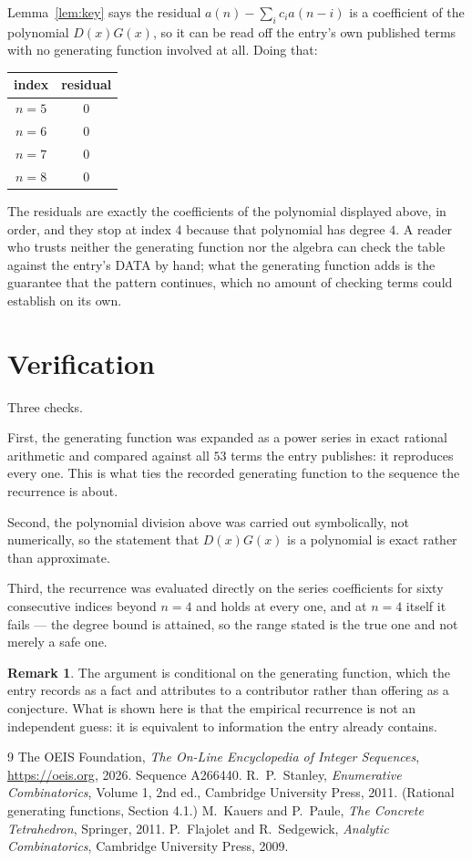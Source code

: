 \documentclass[11pt,a4paper]{article}
\theoremstyle{plain}
\theoremstyle{definition}
\newtheorem{remark}[theorem]{Remark}
\begin{document}
Lemma~\ref{lem:key} says the residual $a(n)-\sum_ic_ia(n-i)$ is a coefficient of the
polynomial $D(x)G(x)$, so it can be read off the entry's own published terms with no
generating function involved at all. Doing that:
\begin{center}
\begin{tabular}{cc}
index & residual \\ \hline
$n=5$ & $0$ \\
$n=6$ & $0$ \\
$n=7$ & $0$ \\
$n=8$ & $0$
\end{tabular}
\end{center}
The residuals are exactly the coefficients of the polynomial displayed above, in order, and
they stop at index $4$ because that polynomial has degree $4$. A reader who trusts
neither the generating function nor the algebra can check the table against the entry's DATA
by hand; what the generating function adds is the guarantee that the pattern continues, which
no amount of checking terms could establish on its own.

\section{Verification}

Three checks.

First, the generating function was expanded as a power series in exact rational arithmetic and
compared against all $53$ terms the entry publishes: it reproduces every one. This is
what ties the recorded generating function to the sequence the recurrence is about.

Second, the polynomial division above was carried out symbolically, not numerically, so the
statement that $D(x)G(x)$ is a polynomial is exact rather than approximate.

Third, the recurrence was evaluated directly on the series coefficients for sixty consecutive
indices beyond $n=4$ and holds at every one, and at $n=4$ itself it fails --- the
degree bound is attained, so the range stated is the true one and not merely a safe one.

\begin{remark}
The argument is conditional on the generating function, which the entry records as a fact and
attributes to a contributor rather than offering as a conjecture. What is shown here is that
the empirical recurrence is not an independent guess: it is equivalent to information the
entry already contains.
\end{remark}

\begin{thebibliography}{9}
 The OEIS Foundation, \emph{The On-Line Encyclopedia of Integer
Sequences}, \url{https://oeis.org}, 2026. Sequence A266440.
 R.~P.~Stanley, \emph{Enumerative Combinatorics}, Volume 1, 2nd ed.,
Cambridge University Press, 2011. (Rational generating functions, Section 4.1.)
 M.~Kauers and P.~Paule, \emph{The Concrete Tetrahedron}, Springer, 2011.
 P.~Flajolet and R.~Sedgewick, \emph{Analytic Combinatorics}, Cambridge
University Press, 2009.
\end{thebibliography}
\end{document}
